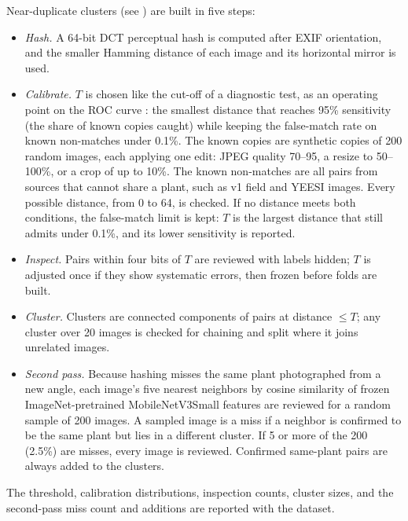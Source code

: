 \documentclass{icsthesis}
\newcommand{\secref}[1]{\textit{\nameref{#1}}}
\begin{document}
\begin{mainmatter}
				Near-duplicate clusters (see \secref{sec:leakctrl}) are built in five
				steps:

				\begin{itemize}
					\item \textit{Hash.} A 64-bit DCT perceptual hash is computed after EXIF
						orientation, and the smaller Hamming distance of each image and its
						horizontal mirror is used.
					\item \textit{Calibrate.} $T$ is chosen like the cut-off of a diagnostic
						test, as an operating point on the ROC curve \citep{fawcett2006}: the
						smallest distance that reaches 95\% sensitivity (the share of known
						copies caught) while keeping the false-match rate on known non-matches
						under 0.1\%. The known copies are synthetic copies of 200 random
						images, each applying one edit: JPEG quality 70--95, a resize to
						50--100\%, or a crop of up to 10\%. The known non-matches are all pairs
						from sources that cannot share a plant, such as v1 field and YEESI
						images. Every possible distance, from 0 to 64, is checked. If no
						distance meets both conditions, the false-match limit is kept: $T$ is
						the largest distance that still admits under 0.1\%, and its lower
						sensitivity is reported.
					\item \textit{Inspect.} Pairs within four bits of $T$ are reviewed with
						labels hidden; $T$ is adjusted once if they show systematic errors,
						then frozen before folds are built.
					\item \textit{Cluster.} Clusters are connected components of pairs at
						distance $\le T$; any cluster over 20 images is checked for chaining
						and split where it joins unrelated images.
					\item \textit{Second pass.} Because hashing misses the same plant
					photographed from a new angle, each image's five nearest neighbors
					by cosine similarity of frozen ImageNet-pretrained MobileNetV3Small
					features are reviewed for a
					random sample of 200 images. A sampled image is a miss if a neighbor
					is confirmed to be the same plant but lies in a different cluster.
					If 5 or more of the 200 (2.5\%) are misses, every image is reviewed.
					Confirmed same-plant pairs are always added to the clusters.
				\end{itemize}

				The threshold, calibration distributions, inspection counts, cluster sizes, and the second-pass miss count and additions are reported with the dataset.


\end{mainmatter}
\end{document}
